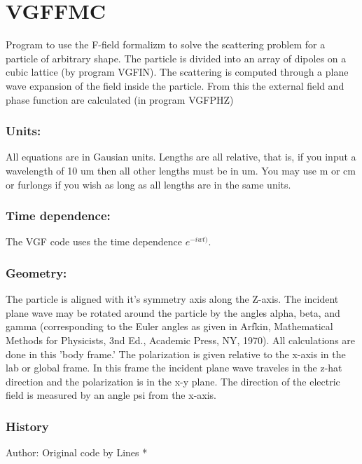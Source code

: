 \documentclass{article}
\begin{document}
\section{VGFFMC}

Program to use the F-field formalizm to solve the scattering problem for a
particle of arbitrary shape. The particle is divided into an array of
dipoles on a cubic lattice (by program VGFIN). The scattering is computed
through a plane wave expansion of the field inside the particle. From this
the external field and phase function are calculated (in program VGFPHZ)

\subsubsection{Units:}

All equations are in Gausian units. Lengths are all relative, that is, if
you input a wavelength of 10 um then all other lengths must be in um. You
may use m or cm or furlongs if you wish as long as all lengths are in the
same units.

\subsubsection{Time dependence:}

The VGF code uses the time dependence $e^{-iwt)}$.

\subsubsection{Geometry:}

The particle is aligned with it's symmetry axis along the Z-axis. The
incident plane wave may be rotated around the particle by the angles alpha,
beta, and gamma (corresponding to the Euler angles as given in Arfkin,
Mathematical Methods for Physicists, 3nd Ed., Academic Press, NY, 1970). All
calculations are done in this 'body frame.' The polarization is given
relative to the x-axis in the lab or global frame. In this frame the
incident plane wave traveles in the z-hat direction and the polarization is
in the x-y plane. The direction of the electric field is measured by an
angle psi from the x-axis.

\subsubsection{History}

Author: Original code by Lines *
\end{document}
